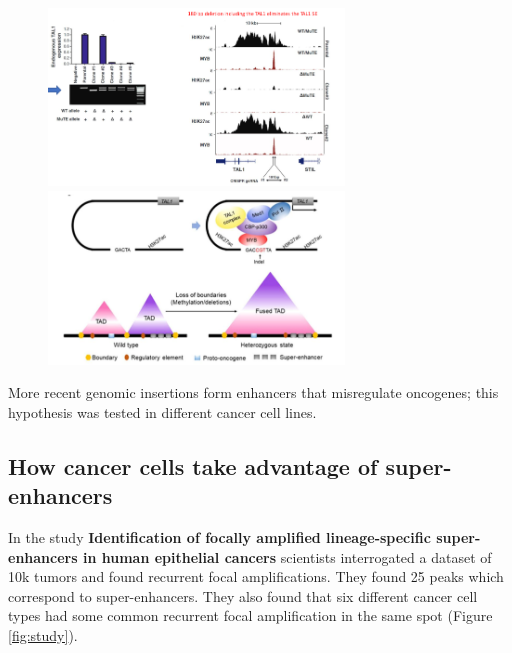 \begin{figure}[!htb]
   \begin{minipage}{0.48\textwidth}
     \centering
    \includegraphics[width=0.7\textwidth]{../_resources/dfb8371fc17e078308c3d5aa247ebcbf.png}
\caption{}
\label{fig:deltal}
   \end{minipage}\hfill
   \begin{minipage}{0.48\textwidth}
     \centering
     \includegraphics[width=0.7\textwidth]{../_resources/8bd5f4820c364c35b02c35eb0e48f464.png}
\caption{}
\label{fig:sup}
   \end{minipage}
\end{figure}

More recent genomic insertions form enhancers that misregulate oncogenes; this hypothesis was tested in different cancer cell lines.

\hypertarget{how-cancer-cells-take-advantage-of-super-enhancers}{%
\subsection{How cancer cells take advantage of super-enhancers}\label{how-cancer-cells-take-advantage-of-super-enhancers}}

In the study \textbf{Identification of focally amplified lineage-specific super-enhancers in human epithelial cancers} scientists interrogated a dataset of 10k tumors and found recurrent focal amplifications. They found 25 peaks which correspond to super-enhancers. They also found that six different cancer cell types had some common recurrent focal amplification in the same spot (Figure \ref{fig:study}).

